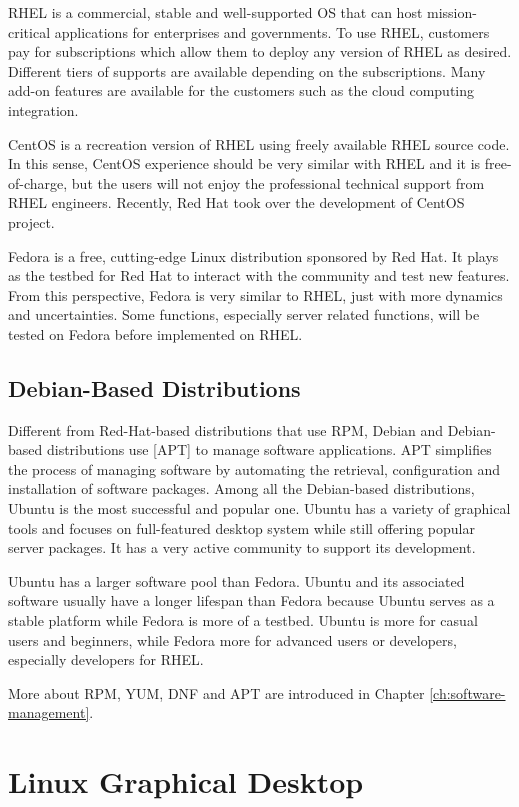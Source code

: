 RHEL is a commercial, stable and well-supported OS that can host mission-critical applications for enterprises and governments. To use RHEL, customers pay for subscriptions which allow them to deploy any version of RHEL as desired. Different tiers of supports are available depending on the subscriptions. Many add-on features are available for the customers such as the cloud computing integration.

CentOS is a recreation version of RHEL using freely available RHEL source code. In this sense, CentOS experience should be very similar with RHEL and it is free-of-charge, but the users will not enjoy the professional technical support from RHEL engineers. Recently, Red Hat took over the development of CentOS project.

Fedora is a free, cutting-edge Linux distribution sponsored by Red Hat. It plays as the testbed for Red Hat to interact with the community and test new features. From this perspective, Fedora is very similar to RHEL, just with more dynamics and uncertainties. Some functions, especially server related functions, will be tested on Fedora before implemented on RHEL.

\subsection{Debian-Based Distributions}

Different from Red-Hat-based distributions that use RPM, Debian and Debian-based distributions use [APT] to manage software applications. APT simplifies the process of managing software by automating the retrieval, configuration and installation of software packages. Among all the Debian-based distributions, Ubuntu is the most successful and popular one. Ubuntu has a variety of graphical tools and focuses on full-featured desktop system while still offering popular server packages. It has a very active community to support its development.

Ubuntu has a larger software pool than Fedora. Ubuntu and its associated software usually have a longer lifespan than Fedora because Ubuntu serves as a stable platform while Fedora is more of a testbed. Ubuntu is more for casual users and beginners, while Fedora more for advanced users or developers, especially developers for RHEL.

More about RPM, YUM, DNF and APT are introduced in Chapter \ref{ch:software-management}.

\section{Linux Graphical Desktop}

